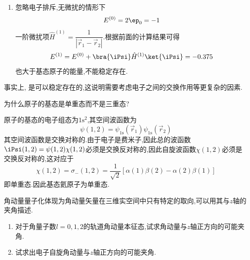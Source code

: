 \documentclass{ctexart}
\begin{document}
\begin{solution}
\begin{enumerate}[label=\tbf{(\alph*)}]
\[\begin{aligned}
            =&\ 16\pi Z_{\text{eff}}^3\left(\int_0^{+\infty}r_1^2\d r_1\int_0^{r_1}\dfrac{\e^{-2Z_{\text{eff}}(r_1+r_2)}}{r_1}r_2^2\d r_2+\int_0^{+\infty}r_2^2\d r_2\int_0^{r_2}\dfrac{\e^{-2Z_{\text{eff}}(r_1+r_2)}}{r_1}r_1^2\d r_1\right)\\
            =&\ 32\pi Z_{\text{eff}}^3\int_0^{+\infty}r_1\d r_1\int_0^{r_1}r_2^2\e^{-2Z_{\text{eff}}(r_1+r_2)}\d r_2\\
            =&\ \dfrac{5}{8}Z_{\text{eff}}
        \end{aligned}\]
        于是系统总能量
        \[E=\bra{\iPsi}\hat{H}\ket{\iPsi}=Z_{\text{eff}}^2-\dfrac{11}{8}{Z_\text{eff}}\]
        将$E$对$Z_{\text{eff}}$求偏导并令其为$0$可得
        \[\dfrac{\p E}{\p Z_{\text{eff}}}=2Z_{\text{eff}}-\dfrac{11}{8}=0\]
        于是$Z_{\text{eff}}=\dfrac{11}{16}$,对应能量为
        \[E=-\dfrac{121}{256}\approx-0.473\]
        基态原子的能量为$-0.5$,小于上面计算得到的能量,因此这一结果表面倾向于电离形成自由电子和氢原子,不能稳定存在.
        \item 忽略电子排斥,无微扰的情形下
        \[E^{(0)}=2\ep_0=-1\]
        一阶微扰项$\hat{H}^{(1)}=\dfrac{1}{\left|\vec{r}_1-\vec{r}_2\right|}$.根据前面的计算结果可得
        \[E^{(1)}=E^{(0)}+\bra{\iPsi}\hat{H}^{(1)}\ket{\iPsi}=-0.375\]
        也大于基态原子的能量,不能稳定存在.
    \end{enumerate}
    事实上, 是可以稳定存在的,这说明需要考虑电子之间的交换作用等更复杂的因素.
\end{solution}
\begin{homework}[10.]
    为什么原子的基态是单重态而不是三重态?
\end{homework}
\begin{solution}
    原子的基态的电子组态为$1\text{s}^2$,其空间波函数为
    \[\psi(1,2)=\psi_{1\text{s}}(\vec{r}_1)\psi_{1\text{s}}(\vec{r}_2)\]
    其空间波函数是交换对称的.由于电子是费米子,因此总的波函数$\iPsi(1,2)=\psi(1,2)\chi(1,2)$必须是交换反对称的,因此自旋波函数$\chi(1,2)$必须是交换反对称的,这对应于
    \[\chi(1,2)=\sigma_-(1,2)=\dfrac{1}{\sqrt{2}}\left[\alpha(1)\beta(2)-\alpha(2)\beta(1)\right]\]
    即单重态.因此基态氦原子为单重态.
\end{solution}
\begin{homework}[11.]
    角动量量子化体现为角动量矢量在三维实空间中只有特定的取向,可以用其与$z$轴的夹角描述.
    \begin{enumerate}[label=\tbf{(\alph*)}]
        \item 对于角量子数$l=0,1,2$的轨道角动量本征态,试求角动量与$z$轴正方向的可能夹角.
        \item 试求出电子自旋角动量与$z$轴正方向的可能夹角.
    \end{enumerate}
\end{homework}
\end{document}
